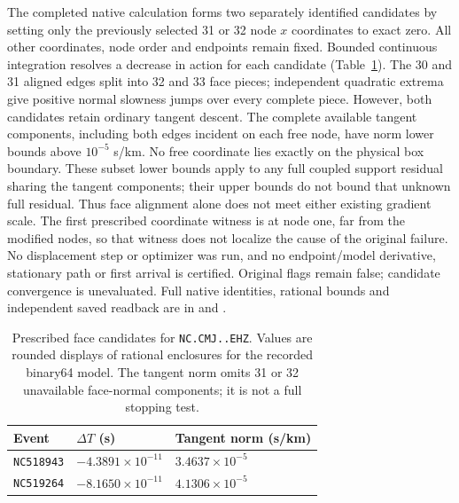 The completed native calculation forms two separately identified candidates
by setting only the previously selected 31 or 32 node $x$ coordinates to
exact zero. All other coordinates, node order and endpoints remain fixed.
Bounded continuous integration resolves a decrease in action for each
candidate (Table~\ref{tab:cmj_face_action}). The 30 and 31 aligned edges split
into 32 and 33 face pieces; independent quadratic extrema give positive
normal slowness jumps over every complete piece. However, both candidates
retain ordinary tangent descent. The complete available tangent components,
including both edges incident on each free node, have norm lower bounds
above $10^{-5}$ s/km. No free coordinate lies exactly on the physical box
boundary. These subset lower bounds apply to any full coupled support
residual sharing the tangent components; their upper bounds do not bound
that unknown full residual. Thus face alignment alone does not meet either
existing gradient scale. The first prescribed coordinate witness is at node
one, far from the modified nodes, so that witness does not localize the cause
of the original failure. No displacement step or optimizer was run, and no
endpoint/model derivative, stationary path or first arrival is certified.
Original flags remain false; candidate convergence is unevaluated. Full native
identities, rational bounds and independent saved readback are in
 and
.

\begin{table}[ht]
\centering
\caption{Prescribed face candidates for \texttt{NC.CMJ..EHZ}. Values are rounded displays of
rational enclosures for the recorded binary64 model. The tangent norm omits
31 or 32 unavailable face-normal components; it is not a full stopping test.}
\label{tab:cmj_face_action}
\begin{tabular}{lll}
\hline
Event & $\Delta T$ (s) & Tangent norm (s/km) \\
\hline
\texttt{NC518943} & $-4.3891\times10^{-11}$ & $3.4637\times10^{-5}$ \\
\texttt{NC519264} & $-8.1650\times10^{-11}$ & $4.1306\times10^{-5}$ \\
\hline
\end{tabular}
\end{table}

